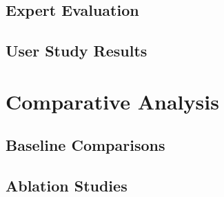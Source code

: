 \subsection{Expert Evaluation}

\subsection{User Study Results}

\section{Comparative Analysis}

\subsection{Baseline Comparisons}

\subsection{Ablation Studies}

\blindtext
